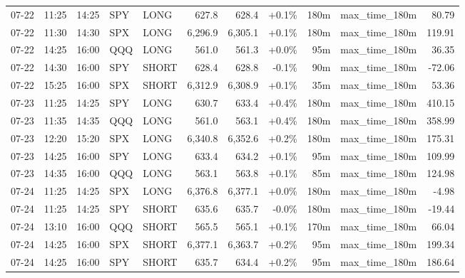 \documentclass[11pt,a4paper,twoside]{article}
\begin{document}
\begin{center}
\begin{longtable}{>{\color{txtmain}}l l l l l r r r r >{\color{txtmain}}l r}
07-22 & 11:25 & 14:25 & SPY & LONG & 627.8 & 628.4 & \textcolor{wingreen}{+0.1\%} & 180m & max\_time\_180m & \textcolor{wingreen}{80.79} \\
07-22 & 11:30 & 14:30 & SPX & LONG & 6,296.9 & 6,305.1 & \textcolor{wingreen}{+0.1\%} & 180m & max\_time\_180m & \textcolor{wingreen}{119.91} \\
07-22 & 14:25 & 16:00 & QQQ & LONG & 561.0 & 561.3 & \textcolor{wingreen}{+0.0\%} & 95m & max\_time\_180m & \textcolor{wingreen}{36.35} \\
07-22 & 14:30 & 16:00 & SPY & SHORT & 628.4 & 628.8 & \textcolor{lossred}{-0.1\%} & 90m & max\_time\_180m & \textcolor{lossred}{-72.06} \\
07-22 & 15:25 & 16:00 & SPX & SHORT & 6,312.9 & 6,308.9 & \textcolor{wingreen}{+0.1\%} & 35m & max\_time\_180m & \textcolor{wingreen}{53.36} \\
07-23 & 11:25 & 14:25 & SPY & LONG & 630.7 & 633.4 & \textcolor{wingreen}{+0.4\%} & 180m & max\_time\_180m & \textcolor{wingreen}{410.15} \\
07-23 & 11:35 & 14:35 & QQQ & LONG & 561.0 & 563.1 & \textcolor{wingreen}{+0.4\%} & 180m & max\_time\_180m & \textcolor{wingreen}{358.99} \\
07-23 & 12:20 & 15:20 & SPX & LONG & 6,340.8 & 6,352.6 & \textcolor{wingreen}{+0.2\%} & 180m & max\_time\_180m & \textcolor{wingreen}{175.31} \\
07-23 & 14:25 & 16:00 & SPY & LONG & 633.4 & 634.2 & \textcolor{wingreen}{+0.1\%} & 95m & max\_time\_180m & \textcolor{wingreen}{109.99} \\
07-23 & 14:35 & 16:00 & QQQ & LONG & 563.1 & 563.8 & \textcolor{wingreen}{+0.1\%} & 85m & max\_time\_180m & \textcolor{wingreen}{124.98} \\
07-24 & 11:25 & 14:25 & SPX & LONG & 6,376.8 & 6,377.1 & \textcolor{wingreen}{+0.0\%} & 180m & max\_time\_180m & \textcolor{lossred}{-4.98} \\
07-24 & 11:25 & 14:25 & SPY & SHORT & 635.6 & 635.7 & \textcolor{lossred}{-0.0\%} & 180m & max\_time\_180m & \textcolor{lossred}{-19.44} \\
07-24 & 13:10 & 16:00 & QQQ & SHORT & 565.5 & 565.1 & \textcolor{wingreen}{+0.1\%} & 170m & max\_time\_180m & \textcolor{wingreen}{66.04} \\
07-24 & 14:25 & 16:00 & SPX & SHORT & 6,377.1 & 6,363.7 & \textcolor{wingreen}{+0.2\%} & 95m & max\_time\_180m & \textcolor{wingreen}{199.34} \\
07-24 & 14:25 & 16:00 & SPY & SHORT & 635.7 & 634.4 & \textcolor{wingreen}{+0.2\%} & 95m & max\_time\_180m & \textcolor{wingreen}{186.64} \\

\end{longtable}
\end{center}
\end{document}
